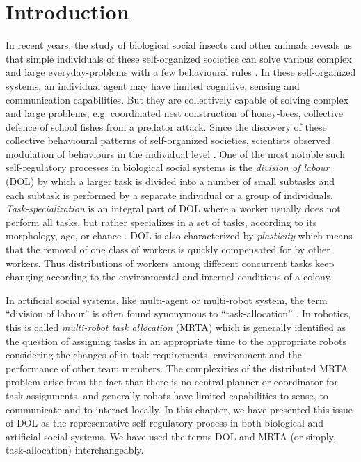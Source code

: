 \documentclass{intech}
\begin{document}
\section{Introduction}
In recent years, the study of biological social insects and other animals reveals us that simple individuals of these self-organized societies can solve various complex and large everyday-problems with a few behavioural rules \citep{Camazine+2001}. In these self-organized systems, an individual agent may have limited cognitive, sensing and communication capabilities. But they are collectively capable of solving complex and large problems, e.g. coordinated nest construction of honey-bees, collective defence of school fishes from a predator attack. Since the discovery of these collective behavioural patterns of self-organized societies, scientists observed modulation of behaviours in the individual level \citep{Garnier+2007}. One of the most notable such self-regulatory processes in biological social systems is the \textit{division of labour} (DOL) \citep{Sendova-Franks+1999} by which a larger task is divided into a number of small subtasks and each subtask is performed by a separate individual or a group of individuals. {\em Task-specialization} is an integral part of DOL where a worker usually does not perform all tasks, but rather specializes in a set of tasks, according to its morphology, age, or chance \citep{Bonabeau+1999}. DOL is also characterized by {\em plasticity} which means that the removal of one class of workers is quickly compensated for by other workers. Thus distributions of workers among different concurrent tasks keep changing according to the environmental and internal conditions of a colony. 

In artificial social systems, like multi-agent or multi-robot system, the term ``division of labour'' is often found synonymous to ``task-allocation'' \citep{Shen+2001}. In robotics, this is called \textit{multi-robot task allocation} (MRTA) which is generally identified as the question of assigning tasks in an appropriate time to the appropriate robots considering the changes of in task-requirements, environment and the performance of other team members. The complexities of the distributed MRTA problem arise from the fact that there is no central planner or coordinator for task assignments, and generally robots have limited capabilities to sense, to communicate and to interact locally. In this chapter, we have presented this issue of DOL as the representative self-regulatory process in both biological and artificial social systems. We have used the terms DOL and MRTA (or simply, task-allocation) interchangeably.
 
\end{document}
